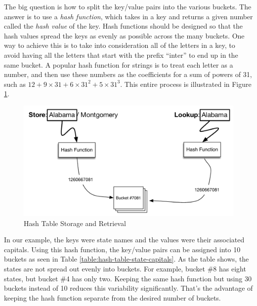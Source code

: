The big question is how to split the key/value pairs into the various buckets.
The answer is to use a \emph{hash function}, which takes in a key and returns
a given number called the \emph{hash value} of the key. Hash functions should 
be designed so that the hash values spread the keys as evenly as possible 
across the many buckets. One way to achieve this is to take into consideration 
all of the letters in a key, to avoid having all the letters that start with 
the prefix ``inter'' to end up in the same bucket. A popular hash function for 
strings is to treat each letter as a number, and then use these numbers as the 
coefficients for a sum of powers of 31, such as 
$12 + 9\times31 + 6\times31^2 + 5\times31^3$.
This entire process is illustrated in Figure \ref{fig:hash-table-process}.

\begin{figure}
\begin{center}
\includegraphics[scale=0.5]{images/hash-table-process.pdf}
\end{center}
\caption{Hash Table Storage and Retrieval}
\label{fig:hash-table-process}
\end{figure}

In our example, the keys were state names and the
values were their associated capitals. Using this hash
function, the key/value pairs can be assigned into 10 
buckets as seen in Table \ref{table:hash-table-state-capitals}.
As the table shows, the states are not spread out evenly into 
buckets. For example, bucket \#8 has
eight states, but bucket \#4 has only two. Keeping the same hash function but using 30 buckets
instead of 10 reduces this variability significantly. That's the advantage of keeping the hash
function separate from the desired number of buckets.

